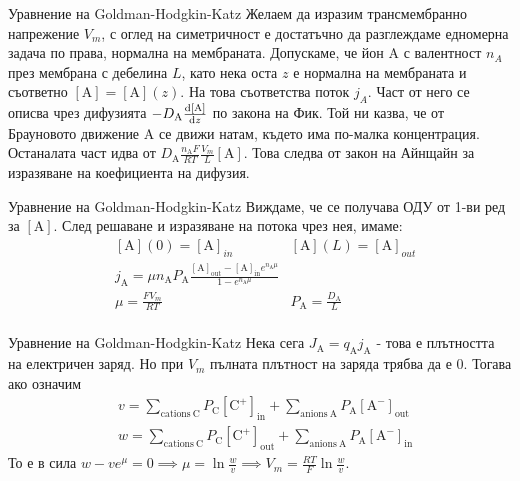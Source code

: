 \begin{frame}[t]{Уравнение на Goldman-Hodgkin-Katz}
    Желаем да изразим трансмембранно напрежение $V_m$, с оглед на симетричност е достатъчно да разглеждаме едномерна задача по права, нормална на мембраната.
    Допускаме, че йон $\mathrm{A}$ с валентност $n_A$ през мембрана с дебелина $L$, като нека оста $z$ е нормална на мембраната и съответно $\left[\mathrm{A}\right]=\left[\mathrm{A}\right](z)$. 
    На това съответства поток $j_A$. Част от него се описва чрез дифузията $-D_{\mathrm{A}}\dv{\left[{\mathrm{A}}\right]}{z}$ по закона на Фик.
    Той ни казва, че от Брауновото движение $\mathrm{A}$ се движи натам, където има по-малка концентрация.
    Останалата част идва от $D_{\mathrm{A}}\frac{n_{\mathrm{A}}F}{RT}\frac{V_m}{L}\left[\mathrm{A}\right]$. 
    Това следва от закон на Айнщайн за изразяване на коефициента на дифузия.
\end{frame}   

\begin{frame}[t]{Уравнение на Goldman-Hodgkin-Katz}
    Виждаме, че се получава ОДУ от 1-ви ред за $\left[\mathrm{A}\right]$. След решаване и изразяване на потока чрез нея, имаме:
    \begin{align*}
        &\left[\mathrm{A}\right](0) = \left[\mathrm{A}\right]_{in} &\left[\mathrm{A}\right](L) = \left[\mathrm{A}\right]_{out} \\
        &j_{\mathrm {A}}=\mu n_{\mathrm {A}}P_{\mathrm{A}}{\frac{\left[\mathrm{A}\right]_{\mathrm {out}}-\left[\mathrm {A}\right]_{\mathrm{in}}e^{n_{\mathrm {A}}\mu}}{1-e^{n_{\mathrm {A}}\mu}}} \\
        &\mu=\frac{FV_m}{RT} &P_{\mathrm{A}}=\frac{D_{\mathrm {A}}}{L}\\
    \end{align*}
\end{frame}

\begin{frame}[t]{Уравнение на Goldman-Hodgkin-Katz}
    Нека сега $J_{\mathrm{A}}=q_{\mathrm{A}}j_{\mathrm{A}}$ - това е плътността на електричен заряд.
    Но при $V_m$ пълната плътност на заряда трябва да е 0. Тогава ако означим 
    \begin{align*}
        &v=\sum_{{{\mathrm{cations\ C}}}}P_{{{\mathrm{C}}}}\left[{\mathrm{C}}^{{+}}\right]_{{{\mathrm{in}}}}+\sum_{{{\mathrm{anions\ A}}}}P_{{{\mathrm{A}}}}\left[{\mathrm{A}}^{{-}}\right]_{{{\mathrm{out}}}} \\
        &w=\sum_{{{\mathrm{cations\ C}}}}P_{{{\mathrm{C}}}}\left[{\mathrm{C}}^{{+}}\right]_{{{\mathrm{out}}}}+\sum_{{{\mathrm{anions\ A}}}}P_{{{\mathrm{A}}}}\left[{\mathrm{A}}^{{-}}\right]_{{{\mathrm{in}}}} 
    \end{align*}
    То е в сила $w - v e^\mu = 0 \implies \mu = \ln \frac{w}{v} \implies V_m = \frac{RT}{F} \ln \frac{w}{v}$. 
\end{frame}

